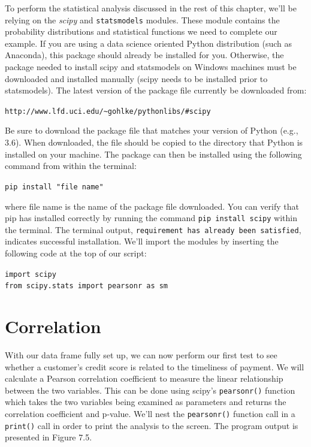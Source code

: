 \documentclass{book}
\begin{document}
To perform the statistical analysis discussed in the rest of this chapter, we'll be relying on the \textit{scipy} and \texttt{statsmodels} modules. These module contains the probability distributions and statistical functions we need to complete our example. If you are using a data science oriented Python distribution (such as Anaconda), this package should already be installed for you. Otherwise, the package needed to install scipy and statsmodels on Windows machines must be downloaded and installed manually (scipy needs to be installed prior to statsmodels). The latest version of the package file currently be downloaded from:

\texttt{http://www.lfd.uci.edu/\textasciitilde gohlke/pythonlibs/\#scipy}

Be sure to download the package file that matches your version of Python (e.g., 3.6). When downloaded, the file should be copied to the directory that Python is installed on your machine. The package can then be installed using the following command from within the terminal: 

\texttt{pip install "file name"}

where file name is the name of the package file downloaded. You can verify that pip has installed correctly by running the command \texttt{pip install scipy} within the terminal. The terminal output, \texttt{requirement has already been satisfied}, indicates successful installation. We'll import the modules by inserting the following code at the top of our script:

\texttt{import scipy\\from scipy.stats import pearsonr\ as sm}

\section{Correlation}

With our data frame fully set up, we can now perform our first test to see whether a customer's credit score is related to the timeliness of payment. We will calculate a Pearson correlation coefficient to measure the linear relationship between the two variables. This can be done using scipy's \texttt{pearsonr()} function which takes the two variables being examined as parameters and returns the correlation coefficient and p-value. We'll nest the \texttt{pearsonr()} function call in a \texttt{print()} call in order to print the analysis to the screen. The program output is presented in Figure 7.5.
\end{document}
